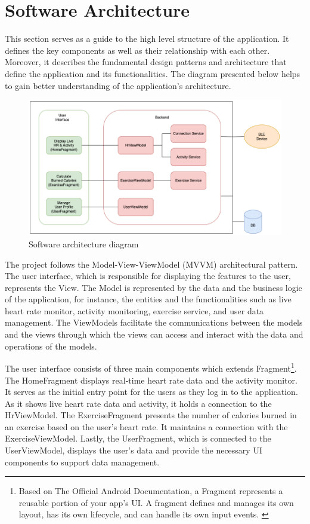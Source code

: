 \section{Software Architecture}
This section serves as a guide to the high level structure of the application. It defines the key components as well as their relationship with each other.
Moreover, it describes the fundamental design patterns and architecture that define the application and its functionalities. 
The diagram presented below helps to gain better understanding of the application's architecture.
\begin{figure}[H]
    \centering
    \includegraphics[width=1\textwidth]{diagrams/architecture-diagram.drawio.png}
    \caption{Software architecture diagram}
    \label{fig:soft_diagram}
\end{figure}
The project follows the Model-View-ViewModel (MVVM) architectural pattern. The user interface, which is responsible for displaying the features to the user, represents the View. 
The Model is represented by the data and the business logic of the application, for instance, the entities and the functionalities such as live heart rate monitor, activity monitoring, exercise service, and user data management. 
The ViewModels facilitate the communications between the models and the views through which the views can access and interact with the data and operations of the models.

The user interface consists of three main components which extends Fragment\footnote{Based on The Official Android Documentation, a Fragment represents a reusable portion of your app's UI. A fragment defines and manages its own layout, has its own lifecycle, and can handle its own input events. \autocite{android-fragments}}. 
The HomeFragment displays real-time heart rate data and the activity monitor. It serves as the initial entry point for the users as they log in to the application. As it shows live heart rate data and activity, it holds a connection to the HrViewModel.
The ExerciseFragment presents the number of calories burned in an exercise based on the user's heart rate. It maintains a connection with the ExerciseViewModel. Lastly, the UserFragment, which is connected to the UserViewModel, displays the user's data and provide the necessary UI components to support data management.


